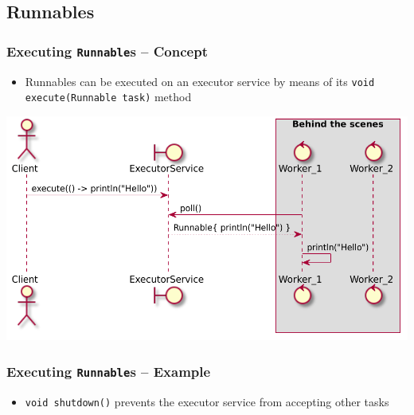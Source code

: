 \documentclass{beamer}\mode<presentation>{\usetheme{AMSCesenaPurpleAndGold}}
\begin{document}
\subsection{Runnables}

\begin{frame}%
\frametitle{Executing \texttt{Runnable}s -- Concept}

\begin{itemize}
\item Runnables can be \alert{executed} on an executor service by means of its \texttt{void execute(Runnable task)} method
\end{itemize}
%
\begin{center}
\includegraphics[width=.7\linewidth]{img/execute.pdf}
\end{center}
%

\end{frame}

\begin{frame}%
\frametitle{Executing \texttt{Runnable}s -- Example}



\vfill

\begin{itemize}
\item \texttt{void shutdown()} prevents the executor service from accepting other tasks
\end{itemize}

\end{frame}
\end{document}
